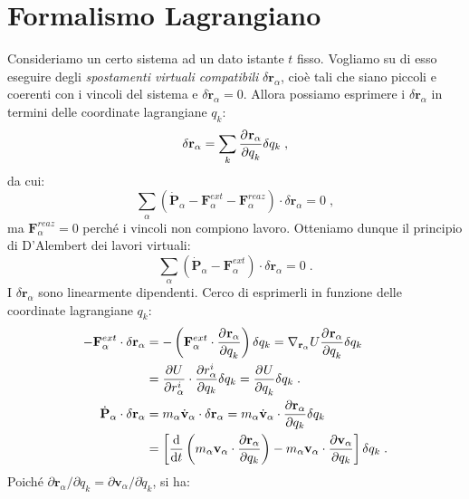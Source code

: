 \section{Formalismo Lagrangiano}
Consideriamo un certo sistema ad un dato istante $t$ fisso. Vogliamo su di esso eseguire degli \textit{spostamenti virtuali compatibili} $\delta\mathbf{r}_{\alpha}$, cioè tali che siano piccoli e coerenti con i vincoli del sistema e $\delta\dot{\mathbf{r}}_{\alpha}=0$. Allora possiamo esprimere i $\delta\mathbf{r}_{\alpha}$ in termini delle coordinate lagrangiane $q_k$:
\begin{equation}
\delta\mathbf{r}_{\alpha}=\sum_k \frac{\partial^{}\mathbf{r}_{\alpha}}{\partial q_k^{}}\delta q_k\;,
\end{equation}
da cui:
\begin{equation}
\sum_{\alpha} (\dot{\mathbf{P}}_{\alpha}-\mathbf{F}_{\alpha}^{ext}-\mathbf{F}_{\alpha}^{reaz})\cdot \delta\mathbf{r}_{\alpha}=0\;,
\end{equation}
ma $\mathbf{F}_{\alpha}^{reaz}=0$ perché i vincoli non compiono lavoro. Otteniamo dunque il principio di D'Alembert dei lavori virtuali:
\begin{equation}
\sum_{\alpha}(\dot{\mathbf{P}}_{\alpha}-\mathbf{F}_{\alpha}^{ext})\cdot\delta\mathbf{r}_{\alpha}=0\;.
\end{equation}
I $\delta\mathbf{r}_{\alpha}$ sono linearmente dipendenti. Cerco di esprimerli in funzione delle coordinate lagrangiane $q_k$:
\begin{align}
-\mathbf{F}_{\alpha}^{ext}\cdot\delta\mathbf{r}_{\alpha} &= -\left(\mathbf{F}_{\alpha}^{ext}\cdot\frac{\partial^{}\mathbf{r}_{\alpha}}{\partial q_k^{}}\right)\delta q_k=\nabla_{\mathbf{r}_{\alpha}}U\frac{\partial^{}\mathbf{r}_{\alpha}}{\partial q_k^{}}\delta q_k \notag \\
&=\frac{\partial U}{\partial r^i_{\alpha}}\cdot \frac{\partial r^i_{\alpha}}{\partial q_k}\delta q_k=\frac{\partial^{}U}{\partial q_k^{}}\delta q_k\;. \\
\dot{\mathbf{P}}_{\alpha}\cdot\delta\mathbf{r}_{\alpha} &= m_{\alpha}\dot{\mathbf{v}}_{\alpha}\cdot\delta\mathbf{r}_{\alpha}=m_{\alpha}\dot{\mathbf{v}}_{\alpha}\cdot\frac{\partial\mathbf{r}_{\alpha}}{\partial q_k}\delta q_k \notag \\
&=\left[\frac{\mathrm{d}}{\mathrm{d}{t}}\left(m_{\alpha}\mathbf{v}_{\alpha}\cdot\frac{\partial\mathbf{r}_{\alpha}}{\partial q_k}\right)-m_{\alpha}\mathbf{v}_{\alpha}\cdot\frac{\partial\mathbf{v}_{\alpha}}{\partial q_k}\right]\delta q_k\;.
\end{align}
Poiché $\partial\mathbf{r}_{\alpha}/\partial q_k=\partial\mathbf{v}_{\alpha}/\partial\dot{q}_k$, si ha:
